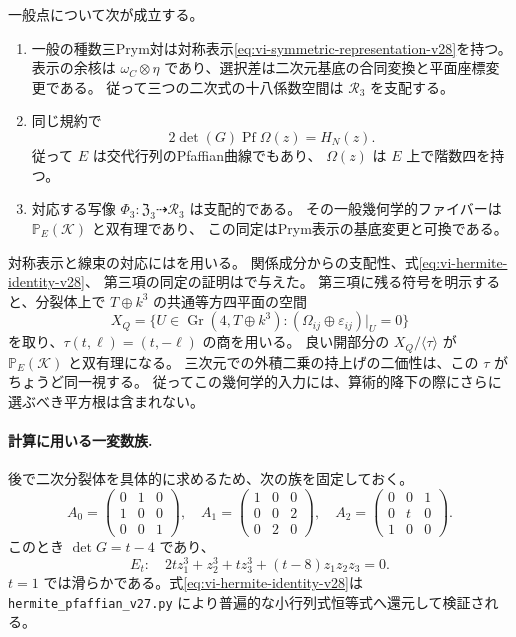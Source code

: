 \begin{proposition}[本稿で用いる幾何学的事実]
\label{prop:vi-geometric-input-v28}
一般点について次が成立する。
\begin{enumerate}
\item 一般の種数三Prym対は対称表示\eqref{eq:vi-symmetric-representation-v28}を持つ。
表示の余核は $\omega_C\otimes\eta$ であり、選択差は二次元基底の合同変換と平面座標変更である。
従って三つの二次式の十八係数空間は $\mathcal R_3$ を支配する。
\item 同じ規約で
\begin{equation}\label{eq:vi-hermite-identity-v28}
 2\det(G)\operatorname{Pf}\Omega(z)=H_N(z).
\end{equation}
従って $E$ は交代行列のPfaffian曲線でもあり、
$\Omega(z)$ は $E$ 上で階数四を持つ。
\item 対応する写像
$\Phi_3:\mathfrak Z_3\dashrightarrow\mathcal R_3$ は支配的である。
その一般幾何学的ファイバーは $\mathbb P_E(\mathcal K)$ と双有理であり、
この同定はPrym表示の基底変更と可換である。
\end{enumerate}
\end{proposition}

対称表示と線束の対応には\cite{BeauvilleDeterminantal}を用いる。
関係成分からの支配性、式\eqref{eq:vi-hermite-identity-v28}、
第三項の同定の証明は\cite{PaperV}で与えた。
第三項に残る符号を明示すると、分裂体上で $T\oplus k^3$ の共通等方四平面の空間
\[
 X_Q=\{U\in\operatorname{Gr}(4,T\oplus k^3):
          (\Omega_{ij}\oplus\varepsilon_{ij})|_U=0\}
\]
を取り、$\tau(t,\ell)=(t,-\ell)$ の商を用いる。
良い開部分の $X_Q/\langle\tau\rangle$ が $\mathbb P_E(\mathcal K)$ と双有理になる。
三次元での外積二乗の持上げの二価性は、この $\tau$ がちょうど同一視する。
従ってこの幾何学的入力には、算術的降下の際にさらに選ぶべき平方根は含まれない。

\paragraph{計算に用いる一変数族.}
後で二次分裂体を具体的に求めるため、次の族を固定しておく。
\begin{equation}\label{eq:vi-hesse-example-v28}
 A_0=\begin{pmatrix}0&1&0\\1&0&0\\0&0&1\end{pmatrix},\quad
 A_1=\begin{pmatrix}1&0&0\\0&0&2\\0&2&0\end{pmatrix},\quad
 A_2=\begin{pmatrix}0&0&1\\0&t&0\\1&0&0\end{pmatrix}.
\end{equation}
このとき $\det G=t-4$ であり、
\[
 E_t:\quad 2tz_1^3+z_2^3+tz_3^3+(t-8)z_1z_2z_3=0.
\]
$t=1$ では滑らかである。式\eqref{eq:vi-hermite-identity-v28}は
\nolinkurl{hermite_pfaffian_v27.py} により普遍的な小行列式恒等式へ還元して検証される。

